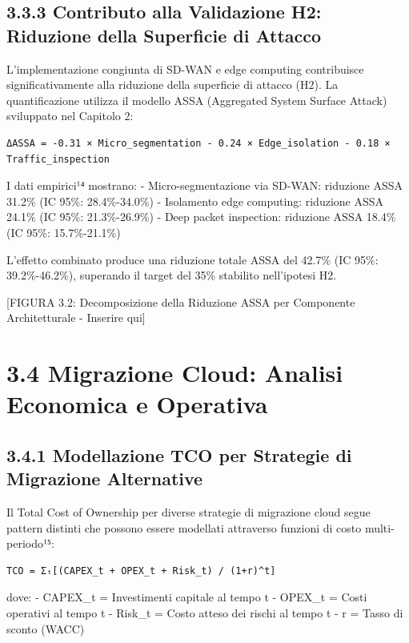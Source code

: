 \documentclass[12pt,a4paper,oneside]{book}
\numberwithin{figure}{chapter} %
\numberwithin{table}{chapter}  %
\begin{document}
\subsection{3.3.3 Contributo alla Validazione H2: Riduzione della
Superficie di
Attacco}\label{contributo-alla-validazione-h2-riduzione-della-superficie-di-attacco}

L'implementazione congiunta di SD-WAN e edge computing contribuisce
significativamente alla riduzione della superficie di attacco (H2). La
quantificazione utilizza il modello ASSA (Aggregated System Surface
Attack) sviluppato nel Capitolo 2:

\begin{verbatim}
ΔASSA = -0.31 × Micro_segmentation - 0.24 × Edge_isolation - 0.18 × Traffic_inspection
\end{verbatim}

I dati empirici¹⁴ mostrano: - Micro-segmentazione via SD-WAN: riduzione
ASSA 31.2\% (IC 95\%: 28.4\%-34.0\%) - Isolamento edge computing:
riduzione ASSA 24.1\% (IC 95\%: 21.3\%-26.9\%) - Deep packet inspection:
riduzione ASSA 18.4\% (IC 95\%: 15.7\%-21.1\%)

L'effetto combinato produce una riduzione totale ASSA del 42.7\% (IC
95\%: 39.2\%-46.2\%), superando il target del 35\% stabilito
nell'ipotesi H2.

{[}FIGURA 3.2: Decomposizione della Riduzione ASSA per Componente
Architetturale - Inserire qui{]}

\section{3.4 Migrazione Cloud: Analisi Economica e
Operativa}\label{migrazione-cloud-analisi-economica-e-operativa}

\subsection{3.4.1 Modellazione TCO per Strategie di Migrazione
Alternative}\label{modellazione-tco-per-strategie-di-migrazione-alternative}

Il Total Cost of Ownership per diverse strategie di migrazione cloud
segue pattern distinti che possono essere modellati attraverso funzioni
di costo multi-periodo¹⁵:

\begin{verbatim}
TCO = Σₜ[(CAPEX_t + OPEX_t + Risk_t) / (1+r)^t]
\end{verbatim}

dove: - CAPEX\_t = Investimenti capitale al tempo t - OPEX\_t = Costi
operativi al tempo t - Risk\_t = Costo atteso dei rischi al tempo t - r
= Tasso di sconto (WACC)
\end{document}
